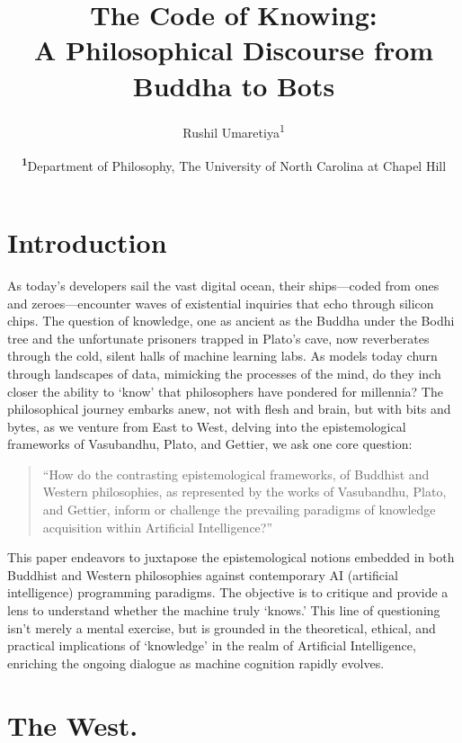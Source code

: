 \documentclass[
	a4paper, %
	10pt, %
	unnumberedsections, %
	twoside, %
]{LTJournalArticle}
\title{The Code of Knowing: \\A Philosophical Discourse from Buddha to Bots} %
\author{%
	Rushil Umaretiya\textsuperscript{1}
}
\date{\footnotesize\textsuperscript{\textbf{1}}Department of Philosophy, The University of North Carolina at Chapel Hill}
\begin{document}
\maketitle %


\section{Introduction}
As today’s developers sail the vast digital ocean, their ships—coded from ones and zeroes—encounter waves of existential inquiries that echo through silicon chips. The question of knowledge, one as ancient as the Buddha under the Bodhi tree and the unfortunate prisoners trapped in Plato’s cave, now reverberates through the cold, silent halls of machine learning labs. As models today churn through landscapes of data, mimicking the processes of the mind, do they inch closer the ability to ‘know’ that philosophers have pondered for millennia? The philosophical journey embarks anew, not with flesh and brain, but with bits and bytes, as we venture from East to West, delving into the epistemological frameworks of Vasubandhu, Plato, and Gettier, we ask one core question:

\begin{quote}
    “How do the contrasting epistemological frameworks, of Buddhist and Western philosophies, as represented by the works of Vasubandhu, Plato, and Gettier,  inform or challenge the prevailing paradigms of knowledge acquisition within Artificial Intelligence?”
\end{quote}

This paper endeavors to juxtapose the epistemological notions embedded in both Buddhist and Western philosophies against contemporary AI (artificial intelligence) programming paradigms. The objective is to critique and provide a lens to understand whether the machine truly ‘knows.’ This line of questioning isn’t merely a mental exercise, but is grounded in the theoretical, ethical, and practical implications of ‘knowledge’ in the realm of Artificial Intelligence, enriching the ongoing dialogue as machine cognition rapidly evolves.

\section{The West.}
\end{document}
